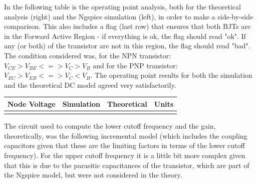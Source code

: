 In the following table is the operating point analysis, both for the theoretical analysis (right) and the Ngspice simulation (left), in order to make a side-by-side comparison. This also includes a flag (last row) that ensures that both BJTs are in the Forward Active Region - if everything is ok, the flag should read "ok". If any (or both) of the transistor are not in this region, the flag should read "bad". The condition considered was, for the NPN transistor: $V_{CE} > V_{BE} <=> V_{C} > V_{B}$ and for the PNP transistor: $V_{EC} > V_{EB} <=> V_{C} < V_{B}$. The operating point results for both the simulation and the theoretical DC model agreed very satisfactorily. \par

\hfill
 \parbox{1\linewidth}{
  \centering
  \begin{tabular}{|l|l|l|r|}
    \hline    
    {\bf Node Voltage} & {\bf Simulation} & {\bf Theoretical } & {\bf Units }\\ \hline
    
  \label{tab:op_FAR}
  \end{tabular}
  }
\par
The circuit used to compute the lower cutoff frequency and the gain, theoretically, was the following incremental model (which includes the coupling capacitors given that these are the limiting factors in terms of the lower cutoff frequency). For the upper cutoff frequency it is a little bit more complex given that this is due to the parasitic capacitances of the transistor, which are part of the Ngspice model, but were not considered in the theory.\par 

